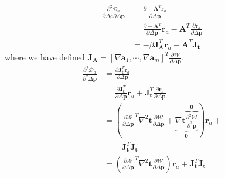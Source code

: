 \begin{equation}
    \begin{aligned}
		\frac{\partial^2 \mathcal{D}_a}{\partial \Delta \mathbf{c} \partial \Delta \mathbf{p}} & = \frac{\partial -\mathbf{A}^T \mathbf{r}_a}{\partial \Delta \mathbf{p}}
		\\
		& = \frac{\partial -\mathbf{A}^T}{\partial \Delta \mathbf{p}} \mathbf{r}_a - \mathbf{A}^T \frac{\partial\mathbf{r}_a}{\partial \Delta \mathbf{p}}
		\\
		& = -\beta \mathbf{J}_\mathbf{A}^T \mathbf{r}_a - \mathbf{A}^T \mathbf{J}_{\mathbf{t}}
    \label{eq:asymmetric_hessian_term2}
    \end{aligned}
\end{equation}
where we have defined $\mathbf{J}_\mathbf{A} = [\nabla \mathbf{a}_1, \cdots, \nabla \mathbf{a}_m]^T \frac{\partial\mathcal{W}}{\partial \Delta \mathbf{p}}$.
\begin{equation}
    \begin{aligned}
		\frac{\partial^2 \mathcal{D}_a}{\partial^2 \Delta \mathbf{p}} & =  \frac{\partial \mathbf{J}_{\mathbf{t}}^T \mathbf{r}_a}{\partial \Delta \mathbf{p}}
		\\
		& = \frac{\partial \mathbf{J}_{\mathbf{t}}^T}{\partial \Delta \mathbf{p}} \mathbf{r}_a + \mathbf{J}_{\mathbf{t}}^T \frac{\partial \mathbf{r}_a}{\partial \Delta \mathbf{p}}
		\\
		& = \left( \frac{\partial\mathcal{W}}{\partial \Delta \mathbf{p}}^T \nabla^2 \mathbf{t} \frac{\partial\mathcal{W}}{\partial \Delta \mathbf{p}} + \underbrace{\nabla \mathbf{t} \overbrace{\frac{\partial^2 \mathcal{W}}{\partial^2 \mathbf{p}}}^{\mathbf{0}}}_{\mathbf{0}} \right) \mathbf{r}_a +
		\\
		& \qquad \, \mathbf{J}_{\mathbf{t}}^T \mathbf{J}_{\mathbf{t}}
		\\
		& = \left( \frac{\partial\mathcal{W}}{\partial \Delta \mathbf{p}}^T \nabla^2 \mathbf{t} \frac{\partial\mathcal{W}}{\partial \Delta \mathbf{p}} \right) \mathbf{r}_a + \mathbf{J}_{\mathbf{t}}^T \mathbf{J}_{\mathbf{t}}
    \label{eq:asymmetric_hessian_term3}
    \end{aligned}
\end{equation}

